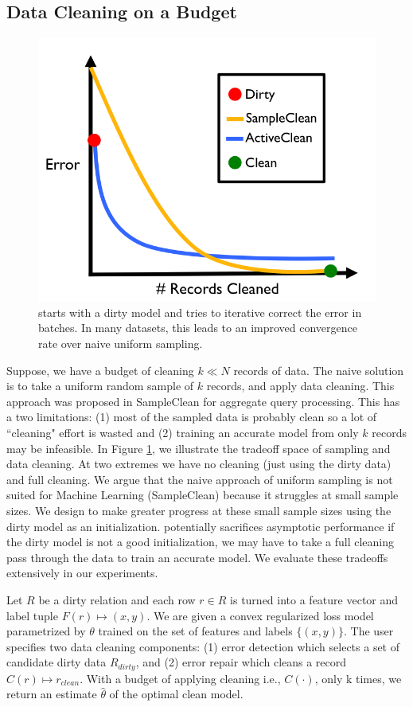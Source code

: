 \subsection{Data Cleaning on a Budget}

\begin{figure}[t]
\centering
 \includegraphics[width=0.6\columnwidth]{figs/arch2.png}
 \caption{\sysfull starts with a dirty model and tries to iterative correct the error in batches. In many datasets, this leads to an improved convergence rate over naive uniform sampling. \label{sys-arch2}}
\end{figure}

Suppose, we have a budget of cleaning $k \ll N$ records of data.
The naive solution is to take a uniform random sample of $k$ records, and apply data cleaning.
This approach was proposed in SampleClean \cite{wang1999sample} for aggregate query processing.
This has a two limitations: (1) most of the sampled data is probably clean so a lot of ``cleaning" effort is wasted and (2) training an accurate model from only $k$ records may be infeasible.
In Figure \ref{sys-arch2}, we illustrate the tradeoff space of sampling and data cleaning.
At two extremes we have no cleaning (just using the dirty data) and full cleaning.
We argue that the naive approach of uniform sampling is not suited for Machine Learning (SampleClean) because it struggles at small sample sizes.
We design \sys to make greater progress at these small sample sizes using the dirty model as an initialization.
\sys potentially sacrifices asymptotic performance if the dirty model is not a good initialization, we may have to take a full cleaning pass through the data to train an accurate model.
We evaluate these tradeoffs extensively in our experiments.

\begin{problem}\label{activeclean}\sloppy
Let $R$ be a dirty relation and each row $r \in R$ is 
turned into a feature vector and label tuple $F(r) \mapsto (x,y)$.
We are given a convex regularized loss model parametrized
by $\theta$ trained on the set of features and labels $\{(x,y)\}$.
The user specifies two data cleaning components: (1) error detection
which selects a set of candidate dirty data $R_{dirty}$, and (2) error 
repair which cleans a record $C(r) \mapsto r_{clean}$.
With a budget of applying cleaning i.e., $C(\cdot)$, only k times, we return an estimate $\hat{\theta}$ of the optimal clean model.
\end{problem}

